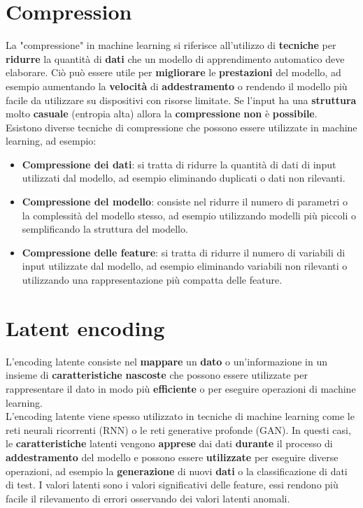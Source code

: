 \documentclass{article}
\begin{document}
\section{Compression}
La "compressione" in machine learning si riferisce all'utilizzo di \textbf{tecniche} per \textbf{ridurre} la quantità di \textbf{dati} che un modello di apprendimento automatico deve elaborare. Ciò può essere utile per \textbf{migliorare} le \textbf{prestazioni} del modello, ad esempio aumentando la \textbf{velocità} di \textbf{addestramento} o rendendo il modello più facile da utilizzare su dispositivi con risorse limitate. Se l'input ha una \textbf{struttura} molto \textbf{casuale} (entropia alta) allora la \textbf{compressione} \textbf{non} è \textbf{possibile}.
\\
Esistono diverse tecniche di compressione che possono essere utilizzate in machine learning, ad esempio:
\\
\begin{itemize}
    \item \textbf{Compressione dei dati}: si tratta di ridurre la quantità di dati di input utilizzati dal modello, ad esempio eliminando duplicati o dati non rilevanti.
    \item \textbf{Compressione del modello}: consiste nel ridurre il numero di parametri o la complessità del modello stesso, ad esempio utilizzando modelli più piccoli o semplificando la struttura del modello.
    \item \textbf{Compressione delle feature}: si tratta di ridurre il numero di variabili di input utilizzate dal modello, ad esempio eliminando variabili non rilevanti o utilizzando una rappresentazione più compatta delle feature.
\end{itemize}

\section{Latent encoding}
L'encoding latente consiste nel \textbf{mappare} un \textbf{dato} o un'informazione in un insieme di \textbf{caratteristiche} \textbf{nascoste} che possono essere utilizzate per rappresentare il dato in modo più \textbf{efficiente} o per eseguire operazioni di machine learning.
\\
L'encoding latente viene spesso utilizzato in tecniche di machine learning come le reti neurali ricorrenti (RNN) o le reti generative profonde (GAN). In questi casi, le \textbf{caratteristiche} latenti vengono \textbf{apprese} dai dati \textbf{durante} il processo di \textbf{addestramento} del modello e possono essere \textbf{utilizzate} per eseguire diverse operazioni, ad esempio la \textbf{generazione} di nuovi \textbf{dati} o la classificazione di dati di test.
I valori latenti sono i valori significativi delle feature, essi rendono più facile il rilevamento di errori osservando dei valori latenti anomali.
\end{document}
